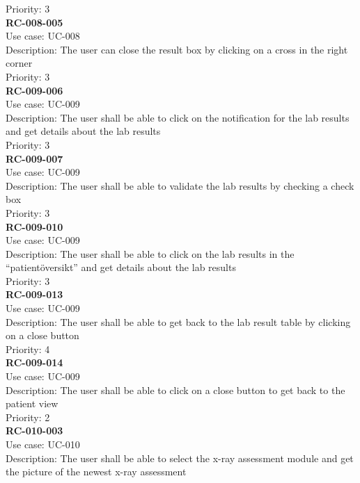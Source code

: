 Priority: 3 \\
\newline
\textbf{RC-008-005} \\
Use case: UC-008 \\
Description: The user can close the  result box by clicking on a cross in the right corner\\
Priority: 3 \\
\newline
\textbf{RC-009-006} \\
Use case: UC-009 \\
Description: The user shall be able to click on the notification for the lab results and get details about the lab results\\
Priority: 3 \\
\newline
\textbf{RC-009-007} \\
Use case: UC-009 \\
Description: The user shall be able to validate the lab results by checking a check box \\
Priority: 3 \\
\newline
\textbf{RC-009-010} \\
Use case: UC-009 \\
Description: The user shall be able to click on the lab results in the “patientöversikt” and get details about the lab results \\
Priority: 3 \\
\newline
\textbf{RC-009-013} \\
Use case: UC-009 \\
Description: The user shall be able to get back to the lab result table by clicking on a close button \\
Priority: 4 \\
\newline
\textbf{RC-009-014} \\
Use case: UC-009 \\
Description: The user shall be able to click on a close button to get back to the patient view \\
Priority: 2 \\
\newline
\textbf{RC-010-003} \\
Use case: UC-010 \\
Description: The user shall be able to select the x-ray assessment module and get the picture of the newest x-ray assessment\\
